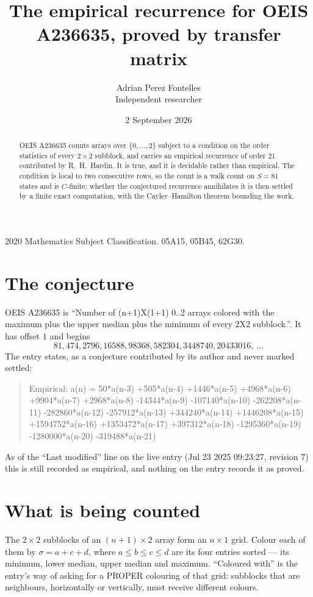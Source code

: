 \documentclass[11pt,a4paper]{article}
\title{The empirical recurrence for OEIS A236635, proved by transfer matrix}
\author{Adrian Perez Fontelles\\ \small Independent researcher}
\date{2 September 2026}
\theoremstyle{plain}
\theoremstyle{definition}
\begin{document}
\maketitle

\begin{abstract}
OEIS A236635 counts arrays over $\{0,\dots,2\}$ subject to a condition on the order
statistics of every $2\times2$ subblock, and carries an empirical recurrence of order
$21$ contributed by R.~H.~Hardin. It is true, and it is decidable rather than empirical.
The condition is local to two consecutive rows, so the count is a walk count on $S=81$
states and is $C$-finite; whether the conjectured recurrence annihilates it is then settled by
a finite exact computation, with the Cayley--Hamilton theorem bounding the work.
\end{abstract}

\noindent\small 2020 Mathematics Subject Classification. 05A15, 05B45, 62G30.\normalsize

\section{The conjecture}

OEIS A236635 is ``Number of (n+1)X(1+1) 0..2 arrays colored with the maximum plus the upper median plus the minimum of every 2X2 subblock.''. It has offset $1$ and begins
\[
81, 474, 2796, 16588, 98368, 582304, 3448740, 20433016,\ \dots
\]
The entry states, as a conjecture contributed by its author and never marked settled:
\begin{quote}
Empirical: a(n) = 50*a(n-3) +505*a(n-4) +1446*a(n-5) +4968*a(n-6) +9904*a(n-7) +2968*a(n-8) -14344*a(n-9) -107140*a(n-10) -262208*a(n-11) -282860*a(n-12) -257912*a(n-13) +344240*a(n-14) +1446208*a(n-15) +1594752*a(n-16) +1353472*a(n-17) +397312*a(n-18) -1295360*a(n-19) -1280000*a(n-20) -319488*a(n-21)
\end{quote}
As of the ``Last modified'' line on the live entry (Jul 23 2025 09:23:27, revision 7) this is still
recorded as empirical, and nothing on the entry records it as proved.

\section{What is being counted}

The $2\times2$ subblocks of an $(n+1)\times2$ array form an
$n\times1$ grid. Colour each of them by $\sigma=a+c+d$, where $a\le b\le c\le d$ are its four entries sorted --- its minimum, lower median, upper median and maximum. ``Coloured with'' is the entry's way of
asking for a PROPER colouring of that grid: subblocks that are neighbours, horizontally or
vertically, must receive different colours.
\end{document}
